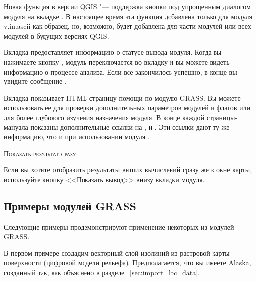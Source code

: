 Новая функция в версии QGIS \CURRENT "--- поддержка кнопки
 под упрощенным диалогом
модуля на вкладке . В настоящее время эта функция
добавлена только для модуля v.in.ascii как образец, но, возможно, будет
добавлена для части модулей или всех модулей в будущих версиях QGIS.


Вкладка  предоставляет информацию о статусе вывода модуля.
Когда вы нажимаете кнопку , модуль переключается во
вкладку  и вы можете видеть информацию о процессе анализа.
Если все закончилось успешно, в конце вы увидите сообщение
.


Вкладка  показывает HTML-страницу помощи по модулю GRASS.
Вы можете использовать ее для проверки дополнительных параметров модулей
и флагов или для более глубокого изучения назначения модуля. В конце
каждой страницы-мануала показаны дополнительные ссылки на
,  и
. Эти ссылки дают ту же информацию, что и при
использовании модуля .

\begin{Tip}\caption{\textsc{Показать результат сразу}}
Если вы хотите отобразить результаты выших вычислений сразу же в окне
карты, используйте кнопку <<Показать вывод>> внизу вкладки модуля.
\end{Tip}

\subsection{Примеры модулей GRASS}

Следующие примеры продемонстрируют применение некоторых из модулей GRASS.


В первом примере создадим векторный слой изолиний из растровой карты
поверхности (цифровой модели рельефа). Предполагается, что вы имеете
 Alaska, созданный так, как объяснено в разделе~
\ref{sec:import_loc_data}.

